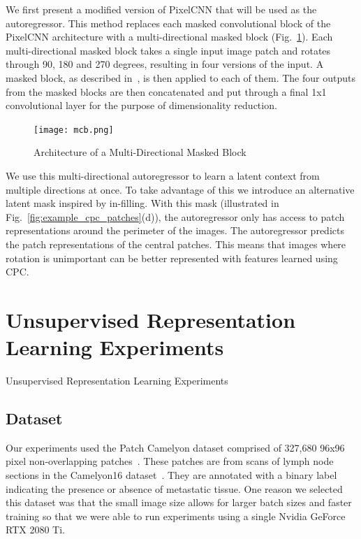 We first present a modified version of PixelCNN that will be used as the autoregressor. This method replaces each masked convolutional block of the PixelCNN architecture with a multi-directional masked block (Fig.~\ref{fig:multi-directional_masked_block}). Each multi-directional masked block takes a single input image patch and rotates through 90, 180 and 270 degrees, resulting in four versions of the input. A masked block, as described in~\cite{oord2016pixel}, is then applied to each of them. The four outputs from the masked blocks are then concatenated and put through a final 1x1 convolutional layer for the purpose of dimensionality reduction.   

\begin{figure}
	\begin{minipage}[b]{1.0\linewidth}
		\centering
		\centerline{\texttt{[image: mcb.png]}}
	\end{minipage}
	\caption{Architecture of a Multi-Directional Masked Block}
	\label{fig:multi-directional_masked_block}
\end{figure}

We use this multi-directional autoregressor to learn a latent context from multiple directions at once. To take advantage of this we introduce an alternative latent mask inspired by in-filling. With this mask (illustrated in Fig.~\ref{fig:example_cpc_patches}(d)), the autoregressor only has access to patch representations around the perimeter of the images. The autoregressor predicts the patch representations of the central patches. This means that images where rotation is unimportant can be better represented with features learned using CPC.



\section{Unsupervised Representation Learning Experiments}
Unsupervised Representation Learning Experiments

\subsection{Dataset}
Our experiments used the Patch Camelyon dataset comprised of 327,680 96x96 pixel non-overlapping patches~\cite{veeling2018rotation}. These patches are from scans of lymph node sections in the Camelyon16 dataset~\cite{litjens20181399}. They are annotated with a binary label indicating the presence or absence of metastatic tissue. One reason we selected this dataset was that the small image size allows for larger batch sizes and faster training so that we were able to run experiments using a single Nvidia GeForce RTX 2080 Ti.

